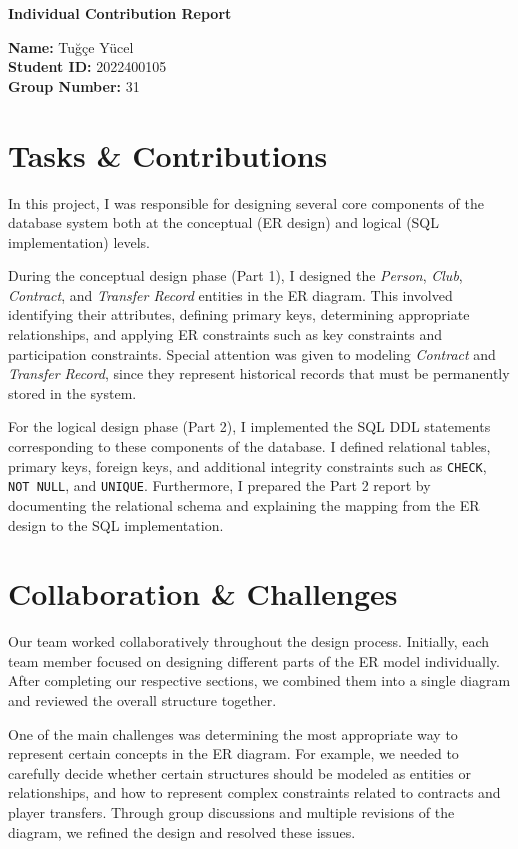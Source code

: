 \documentclass[12pt]{article}
\begin{document}
\begin{center}
\textbf{Individual Contribution Report}
\end{center}

\textbf{Name:} Tuğçe Yücel \\
\textbf{Student ID:} 2022400105 \\
\textbf{Group Number:} 31 \\

\section*{Tasks \& Contributions}

In this project, I was responsible for designing several core components of the database system both at the conceptual (ER design) and logical (SQL implementation) levels.

During the conceptual design phase (Part 1), I designed the \textit{Person}, \textit{Club}, \textit{Contract}, and \textit{Transfer Record} entities in the ER diagram. This involved identifying their attributes, defining primary keys, determining appropriate relationships, and applying ER constraints such as key constraints and participation constraints. Special attention was given to modeling \textit{Contract} and \textit{Transfer Record}, since they represent historical records that must be permanently stored in the system.

For the logical design phase (Part 2), I implemented the SQL DDL statements corresponding to these components of the database. I defined relational tables, primary keys, foreign keys, and additional integrity constraints such as \texttt{CHECK}, \texttt{NOT NULL}, and \texttt{UNIQUE}. Furthermore, I prepared the Part 2 report by documenting the relational schema and explaining the mapping from the ER design to the SQL implementation.

\section*{Collaboration \& Challenges}

Our team worked collaboratively throughout the design process. Initially, each team member focused on designing different parts of the ER model individually. After completing our respective sections, we combined them into a single diagram and reviewed the overall structure together.

One of the main challenges was determining the most appropriate way to represent certain concepts in the ER diagram. For example, we needed to carefully decide whether certain structures should be modeled as entities or relationships, and how to represent complex constraints related to contracts and player transfers. Through group discussions and multiple revisions of the diagram, we refined the design and resolved these issues.
\end{document}
